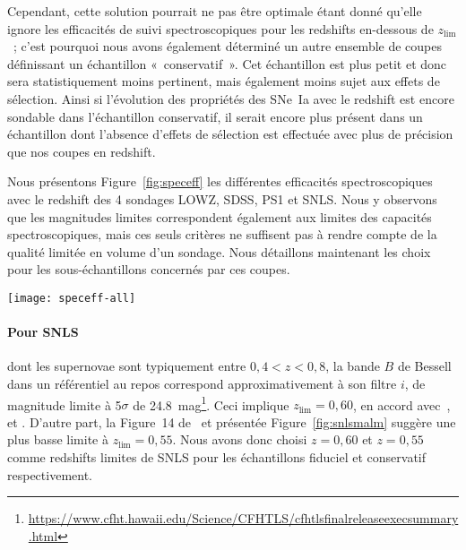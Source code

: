 \documentclass[../main/main.tex]{subfiles}
\begin{document}
Cependant, cette solution pourrait ne pas être optimale étant donné qu'elle
ignore les efficacités de suivi spectroscopiques pour les redshifts en-dessous
de $z_{\lim}$~; c'est pourquoi nous avons également déterminé un autre ensemble
de coupes définissant un échantillon «~conservatif~». Cet échantillon est plus
petit et donc sera statistiquement moins pertinent, mais également moins sujet
aux effets de sélection. Ainsi si l'évolution des propriétés des SNe~Ia avec le
redshift est encore sondable dans l'échantillon conservatif, il serait encore
plus présent dans un échantillon dont l'absence d'effets de sélection est
effectuée avec plus de précision que nos coupes en redshift.

Nous présentons Figure~\ref{fig:speceff} les différentes efficacités
spectroscopiques avec le redshift des 4 sondages LOWZ, SDSS, PS1 et SNLS. Nous y
observons que les magnitudes limites correspondent également aux limites des
capacités spectroscopiques, mais ces seuls critères ne suffisent pas à rendre
compte de la qualité limitée en volume d'un sondage. Nous détaillons maintenant
les choix pour les sous-échantillons concernés par ces coupes.

\begin{SCfigure}[1][h!]
    \centering
    \texttt{[image: speceff-all]}
    \caption[Comparaison des efficacités spectroscopiques des différents
    sondages]{Comparaison des efficacités spectroscopiques des différents
        sondages. Figure produite avec les données de la collaboration
        \textit{Dark Energy Survey} \citep[DES,][]{abbott2019} pour LOWZ, de
        Pantheon \citep{scolnic2018} pour PS1, et de Pantheon+
    \citep{popovic2021b} pour SDSS et SNLS.}
    \label{fig:speceff}
\end{SCfigure}

\paragraph*{Pour SNLS} dont les supernovae sont typiquement entre $0,4 < z <
0,8$, la bande $B$ de Bessell dans un référentiel au repos correspond
approximativement à son filtre $i$, de magnitude limite à 5$\sigma$ de
\SI{24,8}{mag}\footnote{\href{
    https://www.cfht.hawaii.edu/Science/CFHTLS/cfhtlsfinalreleaseexecsummary.html}
{https://www.cfht.hawaii.edu/Science/CFHTLS/cfhtlsfinalreleaseexecsummary.html}}.
Ceci implique $z_{\lim} = 0,60$, en accord avec~\cite{neill2006, perrett2010},
et \citep[Section~2.2]{conley2011}. D'autre part, la Figure~14
de~\cite{perrett2010} et présentée Figure~\ref{fig:snlsmalm} suggère une plus
basse limite à $z_{\lim} = 0,55$. Nous avons donc choisi $z=0,60$ et $z=0,55$
comme redshifts limites de SNLS pour les échantillons fiduciel et conservatif
respectivement.
\end{document}
